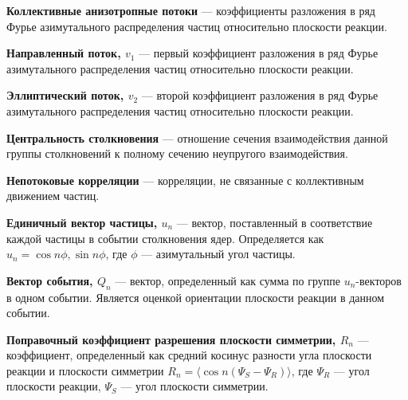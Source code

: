 \textbf{Коллективные анизотропные потоки} --- коэффициенты разложения в ряд Фурье азимутального распределения частиц относительно плоскости реакции.

\textbf{Направленный поток, $v_1$} --- первый коэффициент разложения в ряд Фурье азимутального распределения частиц относительно плоскости реакции.

\textbf{Эллиптический поток, $v_2$} --- второй коэффициент разложения в ряд Фурье азимутального распределения частиц относительно плоскости реакции.

\textbf{Центральность столкновения} --- отношение сечения взаимодействия данной группы столкновений к полному сечению неупругого взаимодействия.

\textbf{Непотоковые корреляции} --- корреляции, не связанные с коллективным движением частиц.

\textbf{Единичный вектор частицы, $u_n$} --- вектор, поставленный в соответствие каждой частицы в событии столкновения ядер. 
Определяется как $u_n = {\cos n\phi, \sin n\phi}$, где $\phi$ --- азимутальный угол частицы.

\textbf{Вектор события, $Q_n$} --- вектор, определенный как сумма по группе $u_n$-векторов в одном событии. 
Является оценкой ориентации плоскости реакции в данном событии. 

\textbf{Поправочный коэффициент разрешения плоскости симметрии, $R_n$} --- коэффициент, определенный как средний косинус разности угла плоскости реакции и плоскости симметрии $R_n = \langle \cos n (\Psi_S - \Psi_R) \rangle$, где $\Psi_R$ --- угол плоскости реакции, $\Psi_S$ --- угол плоскости симметрии. 

